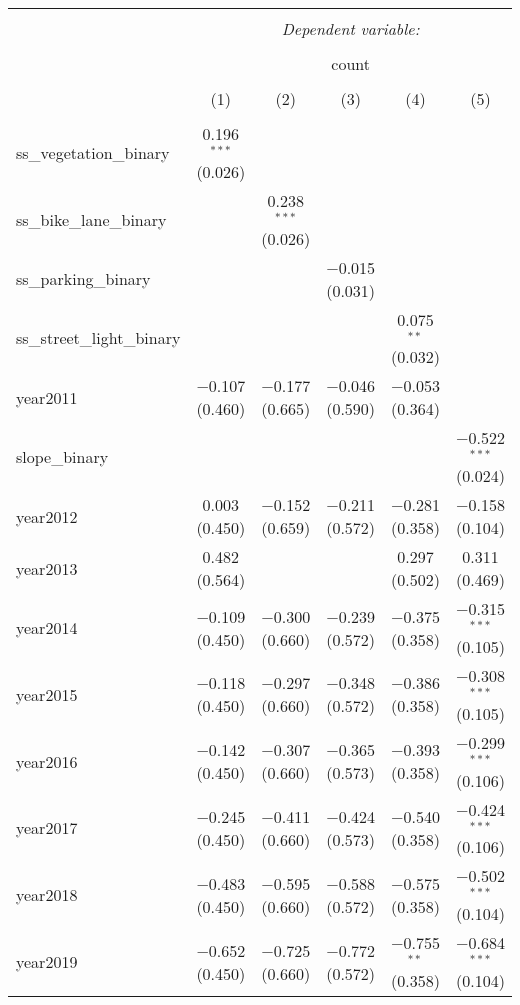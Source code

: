 
\begin{table}[!htbp] \centering 
  \caption{} 
  \label{} 
\small 
\begin{tabular}{@{\extracolsep{1pt}}lccccc} 
\\[-1.8ex]\hline 
\hline \\[-1.8ex] 
 & \multicolumn{5}{c}{\textit{Dependent variable:}} \\ 
\cline{2-6} 
\\[-1.8ex] & \multicolumn{5}{c}{count} \\ 
\\[-1.8ex] & (1) & (2) & (3) & (4) & (5)\\ 
\hline \\[-1.8ex] 
 ss\_vegetation\_binary & 0.196$^{***}$ (0.026) &  &  &  &  \\ 
  ss\_bike\_lane\_binary &  & 0.238$^{***}$ (0.026) &  &  &  \\ 
  ss\_parking\_binary &  &  & $-$0.015 (0.031) &  &  \\ 
  ss\_street\_light\_binary &  &  &  & 0.075$^{**}$ (0.032) &  \\ 
  year2011 & $-$0.107 (0.460) & $-$0.177 (0.665) & $-$0.046 (0.590) & $-$0.053 (0.364) &  \\ 
  slope\_binary &  &  &  &  & $-$0.522$^{***}$ (0.024) \\ 
  year2012 & 0.003 (0.450) & $-$0.152 (0.659) & $-$0.211 (0.572) & $-$0.281 (0.358) & $-$0.158 (0.104) \\ 
  year2013 & 0.482 (0.564) &  &  & 0.297 (0.502) & 0.311 (0.469) \\ 
  year2014 & $-$0.109 (0.450) & $-$0.300 (0.660) & $-$0.239 (0.572) & $-$0.375 (0.358) & $-$0.315$^{***}$ (0.105) \\ 
  year2015 & $-$0.118 (0.450) & $-$0.297 (0.660) & $-$0.348 (0.572) & $-$0.386 (0.358) & $-$0.308$^{***}$ (0.105) \\ 
  year2016 & $-$0.142 (0.450) & $-$0.307 (0.660) & $-$0.365 (0.573) & $-$0.393 (0.358) & $-$0.299$^{***}$ (0.106) \\ 
  year2017 & $-$0.245 (0.450) & $-$0.411 (0.660) & $-$0.424 (0.573) & $-$0.540 (0.358) & $-$0.424$^{***}$ (0.106) \\ 
  year2018 & $-$0.483 (0.450) & $-$0.595 (0.660) & $-$0.588 (0.572) & $-$0.575 (0.358) & $-$0.502$^{***}$ (0.104) \\ 
  year2019 & $-$0.652 (0.450) & $-$0.725 (0.660) & $-$0.772 (0.572) & $-$0.755$^{**}$ (0.358) & $-$0.684$^{***}$ (0.104) \\ 

\end{tabular}
\end{table}
